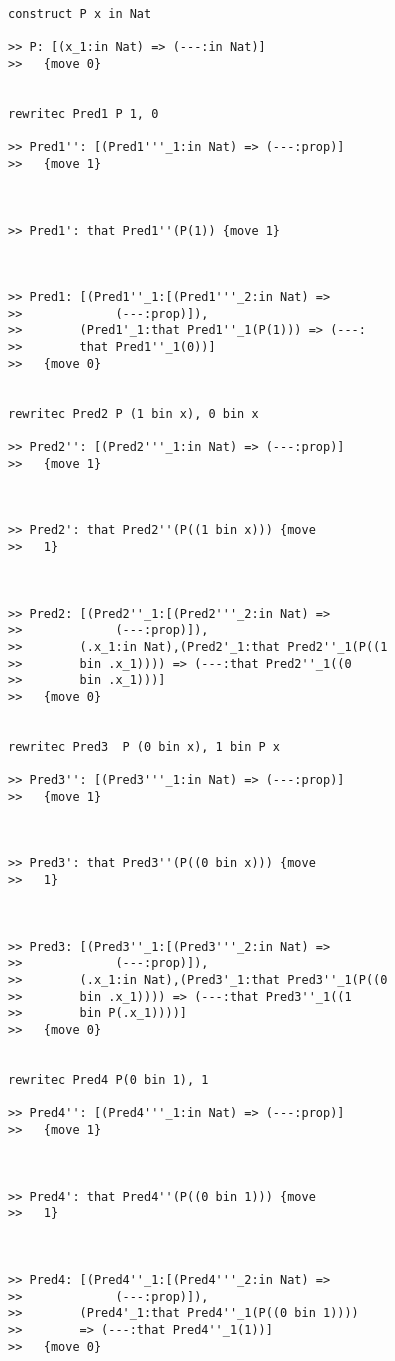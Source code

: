 \documentclass{article}
\begin{document}
\begin{verbatim}
construct P x in Nat

>> P: [(x_1:in Nat) => (---:in Nat)]
>>   {move 0}


rewritec Pred1 P 1, 0

>> Pred1'': [(Pred1'''_1:in Nat) => (---:prop)]
>>   {move 1}



>> Pred1': that Pred1''(P(1)) {move 1}



>> Pred1: [(Pred1''_1:[(Pred1'''_2:in Nat) => 
>>             (---:prop)]),
>>        (Pred1'_1:that Pred1''_1(P(1))) => (---:
>>        that Pred1''_1(0))]
>>   {move 0}


rewritec Pred2 P (1 bin x), 0 bin x

>> Pred2'': [(Pred2'''_1:in Nat) => (---:prop)]
>>   {move 1}



>> Pred2': that Pred2''(P((1 bin x))) {move 
>>   1}



>> Pred2: [(Pred2''_1:[(Pred2'''_2:in Nat) => 
>>             (---:prop)]),
>>        (.x_1:in Nat),(Pred2'_1:that Pred2''_1(P((1 
>>        bin .x_1)))) => (---:that Pred2''_1((0 
>>        bin .x_1)))]
>>   {move 0}


rewritec Pred3  P (0 bin x), 1 bin P x

>> Pred3'': [(Pred3'''_1:in Nat) => (---:prop)]
>>   {move 1}



>> Pred3': that Pred3''(P((0 bin x))) {move 
>>   1}



>> Pred3: [(Pred3''_1:[(Pred3'''_2:in Nat) => 
>>             (---:prop)]),
>>        (.x_1:in Nat),(Pred3'_1:that Pred3''_1(P((0 
>>        bin .x_1)))) => (---:that Pred3''_1((1 
>>        bin P(.x_1))))]
>>   {move 0}


rewritec Pred4 P(0 bin 1), 1

>> Pred4'': [(Pred4'''_1:in Nat) => (---:prop)]
>>   {move 1}



>> Pred4': that Pred4''(P((0 bin 1))) {move 
>>   1}



>> Pred4: [(Pred4''_1:[(Pred4'''_2:in Nat) => 
>>             (---:prop)]),
>>        (Pred4'_1:that Pred4''_1(P((0 bin 1)))) 
>>        => (---:that Pred4''_1(1))]
>>   {move 0}


\end{verbatim}
\end{document}
